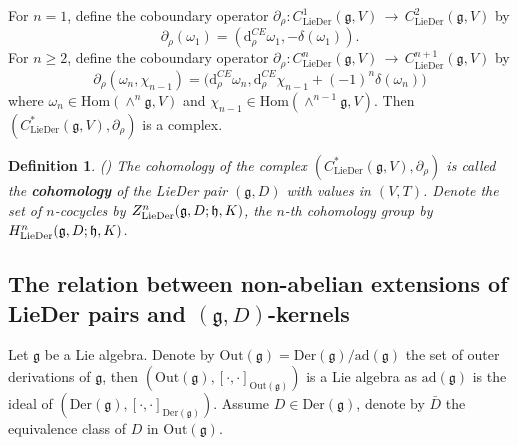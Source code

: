 \documentclass[12pt]{amsart}
\newtheorem{defi}[thm]{Definition}
\newcommand{\lon }{\,\rightarrow\,}
\newcommand{\g}{\mathfrak g}
\newcommand{\h}{\mathfrak h}
\newcommand{\dM}{\mathrm{d}}
\newcommand{\Hom}{\mathrm{Hom}}
\newcommand{\LD}{{\rm LieDer }}
\newcommand{\Der}{\mathrm{Der}}
\newcommand{\Out}{\mathrm{Out}}
\newcommand{\ad}{\mathrm{ad}}
\begin{document}
For $n=1$, define the coboundary operator $\partial_\rho:C^{1}_{\mathrm{LieDer}}(\g, V)\lon C^{2}_{\mathrm{LieDer}}(\g, V)$ by
$$
\partial_\rho(\omega_1)=(\dM_\rho^{CE}\omega_1, -\delta(\omega_1)). 
$$
For $n\geq 2$, define the coboundary operator $\partial_\rho:C^{n}_{\mathrm{LieDer}}(\g, V)\lon C^{n+1}_{\mathrm{LieDer}}(\g, V)$ by
\begin{equation}\label{deficeo}
\partial_\rho(\omega_n, \chi_{n-1})=\Big(\dM_\rho^{CE}\omega_n, \dM_\rho^{CE}\chi_{n-1}+(-1)^n\delta(\omega_n)\Big)
\end{equation}
where $\omega_n\in\Hom(\wedge^{n}\g, V)$ and $\chi_{n-1}\in\Hom(\wedge^{n-1}\g, V)$. Then $(C^{*}_{\mathrm{LieDer}}(\g, V), \partial_\rho)$ is a complex\cite{TFS}.
\begin{defi}{\rm(\cite{TFS})}
The cohomology of the complex $(C^{*}_{\mathrm{LieDer}}(\g, V), \partial_\rho)$ is called the {\bf cohomology} of the \LD pair $(\g, D)$ with values in $(V, T)$. Denote the set of $n$-cocycles by $Z^{n}_{\LD}(\g,D; \h,K)$, the $n$-th cohomology group by $H^{n}_{\LD}(\g, D;\h,K)$.
\end{defi}
\subsection{The relation between non-abelian extensions of LieDer pairs and $(\g, D)$-kernels}
Let $\g$ be a Lie algebra. Denote by $\Out(\g)=\Der(\g)/\ad(\g)$ the set of outer derivations of $\g$, then $(\Out(\g), [\cdot, \cdot]_{\Out(\g)})$ is a Lie algebra as $\ad(\g)$ is the ideal of $(\Der(\g), [\cdot, \cdot]_{\Der(\g)})$. Assume $D\in\Der(\g)$, denote by $\bar{D}$ the equivalence class of $D$ in $\Out(\g)$. 
\end{document}
